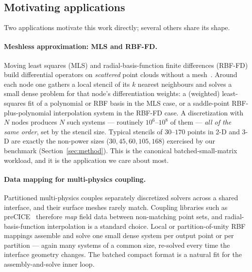 \documentclass[11pt]{article}
\begin{document}
\subsection{Motivating applications}
\label{sec:apps}

Two applications motivate this work directly; several others share its shape.

\paragraph{Meshless approximation: MLS and RBF-FD.}
Moving least squares (MLS) and radial-basis-function finite differences (RBF-FD)
build differential operators on \emph{scattered} point clouds without a
mesh~\cite{fornberg2015,wendland2004}. Around each node one gathers a local
stencil of its $k$ nearest neighbours and solves a small dense problem for that
node's differentiation weights: a (weighted) least-squares fit of a polynomial or
RBF basis in the MLS case, or a saddle-point RBF-plus-polynomial interpolation
system in the RBF-FD case. A discretization with $N$ nodes produces $N$ such
systems --- routinely $10^6$--$10^8$ of them --- \emph{all of the same order},
set by the stencil size. Typical stencils of $30$--$170$ points in 2-D and 3-D
are exactly the non-power sizes ($30,45,60,105,168$) exercised by our benchmark
(Section~\ref{sec:method}). This is the canonical batched-small-matrix workload,
and it is the application we care about most.

\paragraph{Data mapping for multi-physics coupling.}
Partitioned multi-physics couples separately discretized solvers across a shared
interface, and their surface meshes rarely match. Coupling libraries such as
\mbox{preCICE}~\cite{precice2016} therefore \emph{map} field data between
non-matching point sets, and radial-basis-function interpolation is a standard
choice. Local or partition-of-unity RBF mappings assemble and solve one small
dense system per output point or per partition --- again many systems of a
common size, re-solved every time the interface geometry changes. The batched
compact format is a natural fit for the assembly-and-solve inner loop.
\end{document}
